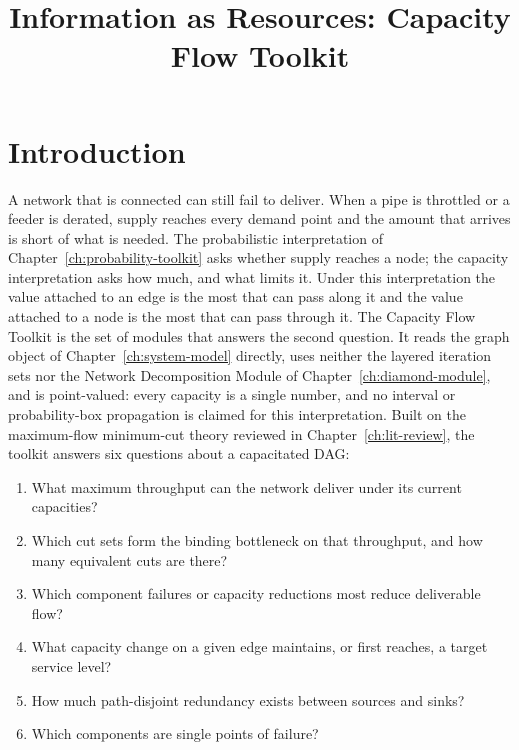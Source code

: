 \documentclass[12pt]{report}
\begin{document}
\title{Information as Resources: Capacity Flow Toolkit}
\fi

\providecommand{\PH}[1]{\textbf{[#1]}}

\section{Introduction}
\label{sec:flow-intro}

A network that is connected can still fail to deliver. When a pipe is throttled or a feeder
is derated, supply reaches every demand point and the amount that arrives is short of what
is needed. The probabilistic interpretation of Chapter~\ref{ch:probability-toolkit} asks
whether supply reaches a node;
the capacity interpretation asks how much, and what limits it. Under this interpretation the
value attached to an edge is the most that can pass along it and the value attached to a
node is the most that can pass through it. The Capacity Flow Toolkit is the set of modules
that answers the second question. It reads the graph object of Chapter~\ref{ch:system-model}
directly, uses neither the layered iteration sets nor the Network Decomposition Module of
Chapter~\ref{ch:diamond-module}, and is point-valued: every capacity is a single number,
and no interval or probability-box propagation is claimed for this interpretation. Built on
the maximum-flow minimum-cut theory reviewed in Chapter~\ref{ch:lit-review}, the toolkit
answers six questions about a capacitated DAG:

\begin{enumerate}[label=\textbf{Q\arabic*.}]
    \item What maximum throughput can the network deliver under its current capacities?
    \item Which cut sets form the binding bottleneck on that throughput, and how many
      equivalent cuts are there?
    \item Which component failures or capacity reductions most reduce deliverable flow?
    \item What capacity change on a given edge maintains, or first reaches, a target service
      level?
    \item How much path-disjoint redundancy exists between sources and sinks?
    \item Which components are single points of failure?
\end{enumerate}
\end{document}
